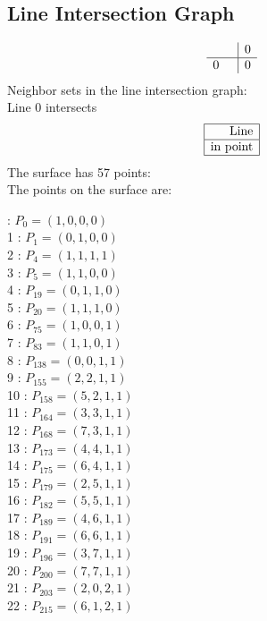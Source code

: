 \documentclass{article}
\begin{document}
{\subsection*{Line Intersection Graph}
{\arraycolsep=1pt
$$
\begin{array}{rr|*{1}r}
 &  & 0\\
\hline
0 &  & 0\\
\end{array}
$$
}%
Neighbor sets in the line intersection graph:\\
Line 0 intersects 
$$
\begin{array}{|r*{0}{|c}|}
\hline
\mbox{Line} \\
\hline
\mbox{in point} \\
\hline
\end{array}
$$
The surface has 57 points:\\
The points on the surface are:\\
\begin{multicols}{3}
 : $P_{0}=( 1, 0, 0, 0 )$\\
1 : $P_{1}=( 0, 1, 0, 0 )$\\
2 : $P_{4}=( 1, 1, 1, 1 )$\\
3 : $P_{5}=( 1, 1, 0, 0 )$\\
4 : $P_{19}=( 0, 1, 1, 0 )$\\
5 : $P_{20}=( 1, 1, 1, 0 )$\\
6 : $P_{75}=( 1, 0, 0, 1 )$\\
7 : $P_{83}=( 1, 1, 0, 1 )$\\
8 : $P_{138}=( 0, 0, 1, 1 )$\\
9 : $P_{155}=( 2, 2, 1, 1 )$\\
10 : $P_{158}=( 5, 2, 1, 1 )$\\
11 : $P_{164}=( 3, 3, 1, 1 )$\\
12 : $P_{168}=( 7, 3, 1, 1 )$\\
13 : $P_{173}=( 4, 4, 1, 1 )$\\
14 : $P_{175}=( 6, 4, 1, 1 )$\\
15 : $P_{179}=( 2, 5, 1, 1 )$\\
16 : $P_{182}=( 5, 5, 1, 1 )$\\
17 : $P_{189}=( 4, 6, 1, 1 )$\\
18 : $P_{191}=( 6, 6, 1, 1 )$\\
19 : $P_{196}=( 3, 7, 1, 1 )$\\
20 : $P_{200}=( 7, 7, 1, 1 )$\\
21 : $P_{203}=( 2, 0, 2, 1 )$\\
22 : $P_{215}=( 6, 1, 2, 1 )$\\

\end{multicols}}
\end{document}
